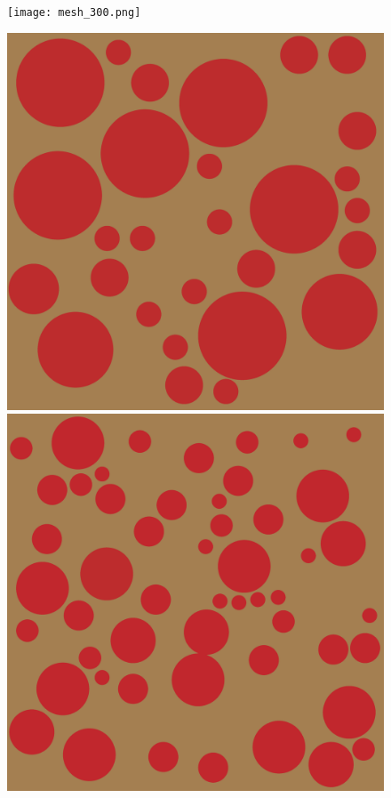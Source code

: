 \documentclass[a4paper,num-refs]{oup-contemporary}
\begin{document}
\begin{figure}
\begin{center}
\begin{minipage}[b]{0.24\linewidth}
				\newline
	\end{minipage} 
	\begin{minipage}[b]{0.24\linewidth}
		\texttt{[image: mesh\_300.png]}
						\newline
	\end{minipage} 
	\begin{minipage}[b]{0.24\linewidth}
	\includegraphics[width=\linewidth]{test_mesh_2.png}
				\newline
	\end{minipage}
	\begin{minipage}[b]{0.24\linewidth}
	\includegraphics[width=\linewidth]{test_mesh_1.png}

\end{minipage}
\end{center}
\end{figure}
\end{document}

